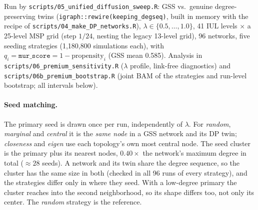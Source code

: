 \documentclass[11pt,a4paper]{article}
\newcommand{\code}[1]{\texttt{#1}}
\begin{document}
\begin{sloppypar}
Run by \code{scripts/05\_unified\_diffusion\_sweep.R}: GSS vs.\ genuine
degree-preserving twins (\code{igraph::rewire(keeping\_degseq)}, built in memory with the
recipe of \code{scripts/04\_make\_DP\_networks.R}), $\lambda \in \{0.5, \dots, 1.0\}$,
41 IUL levels $\times$ a 25-level MSP grid (step $1/24$, nesting the legacy 13-level grid),
96 networks, five seeding strategies (1{,}180{,}800 simulations each), with
$q_i = \code{mur\_score} = 1 - \text{propensity}_i$ (GSS mean 0.585).
Analysis in \code{scripts/06\_premium\_sensitivity.R} ($\lambda$ profile, link-free
diagnostics) and \code{scripts/06b\_premium\_bootstrap.R} (joint BAM of the strategies and
run-level bootstrap; all intervals below).
\end{sloppypar}

\paragraph{Seed matching.} The primary seed is drawn once per run, independently of
$\lambda$. For \emph{random}, \emph{marginal} and \emph{central} it is the \emph{same node}
in a GSS network and its DP twin; \emph{closeness} and \emph{eigen} use each topology's
own most central node. The seed cluster is the primary plus its nearest nodes,
$0.40 \times$ the network's maximum degree in total ($\approx 28$ seeds). A network and
its twin share the degree sequence, so the cluster has the same size in both (checked in
all 96 runs of every strategy), and the strategies differ only in where they seed. With a
low-degree primary the cluster reaches into the second neighborhood, so its shape
differs too, not only its center. The \emph{random} strategy is the reference.
\end{document}

